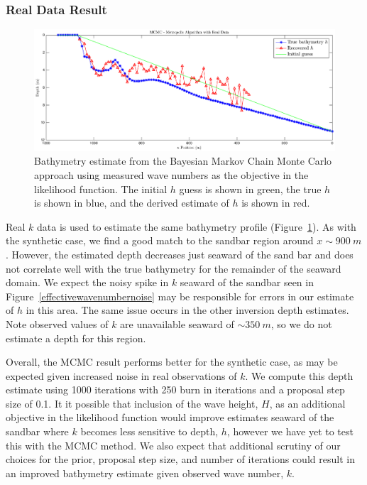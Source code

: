 \subsubsection{Real Data Result}
\begin{figure}[H]
\center
\includegraphics[scale=0.46]{img/MCMC-realdata-600.eps}
\caption{Bathymetry estimate from the Bayesian Markov Chain Monte Carlo approach using measured wave numbers as the objective in the likelihood function. The initial $h$ guess is shown in green, the true $h$ is shown in blue, and the derived estimate of $h$ is shown in red.}
\label{mcmc-real}
\end{figure}

Real $k$ data is used to estimate the same bathymetry profile (Figure~\ref{mcmc-real}). As with the synthetic case, we find a good match to the sandbar region around $x\sim900~m$. However, the estimated depth decreases just seaward of the sand bar and does not correlate well with the true bathymetry for the remainder of the seaward domain. We expect the noisy spike in $k$ seaward of the sandbar seen in  Figure~\ref{effectivewavenumbernoise} may be responsible for errors in our estimate of $h$ in this area. The same issue occurs in the other inversion depth estimates. Note observed values of $k$ are unavailable seaward of $\sim350~m$, so we do not estimate a depth for this region. 

Overall, the MCMC result performs better for the synthetic case, as may be expected given increased noise in real observations of $k$. We compute this depth estimate using 1000 iterations with 250 burn in iterations and a proposal step size of 0.1. It it possible that inclusion of the wave height, $H$, as an additional objective in the likelihood function would improve estimates seaward of the sandbar where $k$ becomes less sensitive to depth, $h$, however we have yet to test this with the MCMC method. We also expect that additional scrutiny of our choices for the prior, proposal step size, and number of iterations could result in an improved bathymetry estimate given observed wave number, $k$. 

